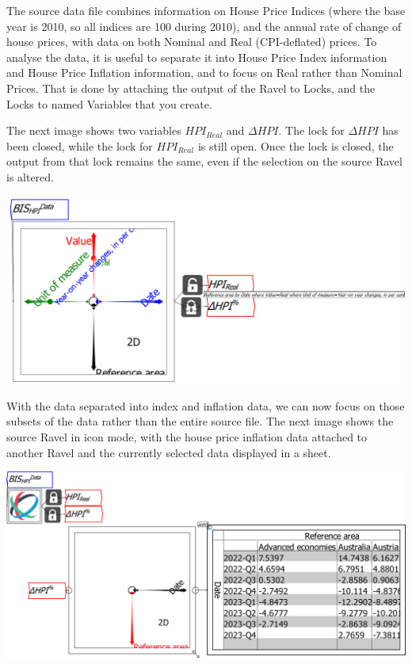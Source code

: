 The source data file combines information on House Price Indices (where the base year is 2010, so all indices are 100 during 2010), and the annual rate of change of house prices, with data on both Nominal and Real (CPI-deflated) prices. To analyse the data, it is useful to separate it into House Price Index information and House Price Inflation information, and to focus on Real rather than Nominal Prices. That is done by attaching the output of the Ravel to Locks, and the Locks to named Variables that you create.

The next image shows two variables $HPI_{Real}$ and $\Delta{HPI}$. The lock for $\Delta{HPI}$ has been closed, while the lock for $HPI_{Real}$ is still open. Once the lock is closed, the output from that lock remains the same, even if the selection on the source Ravel is altered.

\includegraphics{images/tut05HPIandInflationSeparatedLocks.png}

With the data separated into index and inflation data, we can now focus on those subsets of the data rather than the entire source file. The next image shows the source Ravel in icon mode, with the house price inflation data attached to another Ravel and the currently selected data displayed in a sheet.

\includegraphics{images/tut06HPIwithVariablesAssigned02DeltaHPI.eps}

